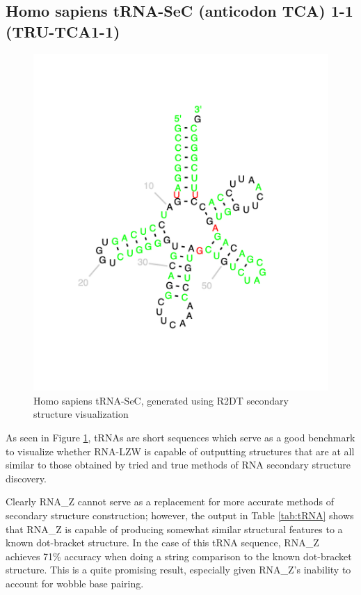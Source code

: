 \documentclass[sigconf]{acmart}
\begin{document}
\subsection{Homo sapiens tRNA-SeC (anticodon TCA) 1-1 (TRU-TCA1-1)}

\begin{figure}
  \includegraphics[width=\linewidth]{for_paper1.png}
  \caption{Homo sapiens tRNA-SeC, generated using R2DT secondary structure visualization}
  \label{fig:tRNA}
\end{figure}

As seen in Figure \ref{fig:tRNA},  tRNAs are short sequences which serve as a good benchmark to visualize whether RNA-LZW is capable of outputting structures that are at all similar to those obtained by tried and true methods of RNA secondary structure discovery. 

Clearly RNA\_Z cannot serve as a replacement for more accurate methods of secondary structure construction; however, the output in Table \ref{tab:tRNA} shows that RNA\_Z is capable of producing somewhat similar structural features to a known dot-bracket structure.  In the case of this tRNA sequence,  RNA\_Z achieves 71\% accuracy when doing a string comparison to the known dot-bracket structure.  This is a quite promising result, especially given RNA\_Z's inability to account for wobble base pairing.
\end{document}
